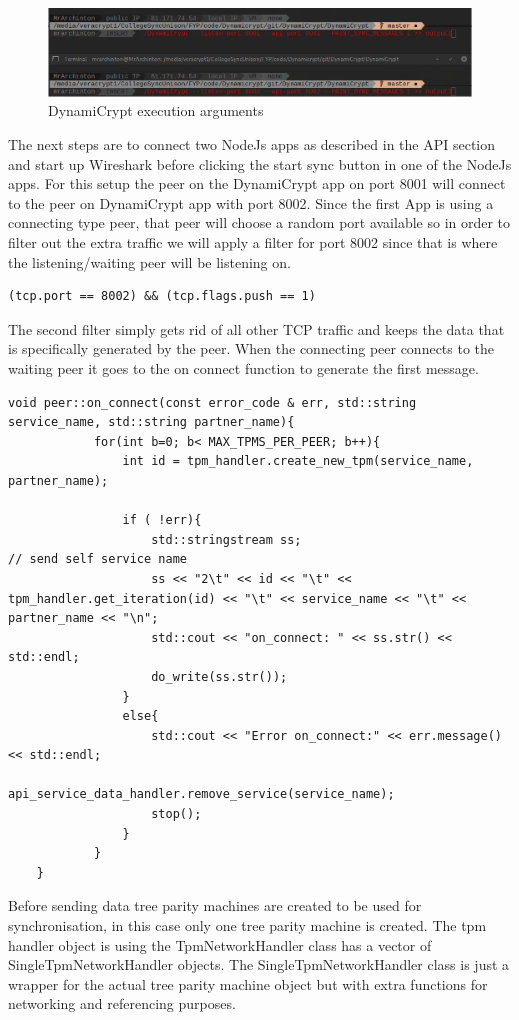 \begin{figure}[!h]
	\centering
	\includegraphics[width=1\textwidth]{Figures/sync1.png}
	\caption[DynamiCrypt execution arguments]{DynamiCrypt execution arguments}
	\label{fig:sync1}
\end{figure}
\FloatBarrier

The next steps are to connect two NodeJs apps as described in the API section and start up Wireshark before clicking the start sync button in one of the NodeJs apps.
For this setup the peer on the DynamiCrypt app on port 8001 will connect to the peer on DynamiCrypt app with port 8002. Since the first App is using a connecting type peer, that peer will choose a random port available so in order to filter out the extra traffic we will apply a filter for port 8002 since that is where the listening/waiting peer will be listening on. 
\begin{lstlisting}
(tcp.port == 8002) && (tcp.flags.push == 1)
\end{lstlisting}
The second filter simply gets rid of all other TCP traffic and keeps the data that is specifically generated by the peer.
When the connecting peer connects to the waiting peer it goes to the on connect function to generate the first message.
\begin{lstlisting}
void peer::on_connect(const error_code & err, std::string service_name, std::string partner_name){
			for(int b=0; b< MAX_TPMS_PER_PEER; b++){
				int id = tpm_handler.create_new_tpm(service_name, partner_name);
				
				if ( !err){      
					std::stringstream ss;                                               // send self service name
					ss << "2\t" << id << "\t" << tpm_handler.get_iteration(id) << "\t" << service_name << "\t" << partner_name << "\n";
					std::cout << "on_connect: " << ss.str() << std::endl;
					do_write(ss.str());
				}
				else{
					std::cout << "Error on_connect:" << err.message() << std::endl;
					api_service_data_handler.remove_service(service_name);
					stop();
				}
			}
	}
\end{lstlisting}
Before sending data tree parity machines are created to be used for synchronisation, in this case only one tree parity machine is created. The tpm handler object is using the TpmNetworkHandler class has a vector of SingleTpmNetworkHandler objects. The SingleTpmNetworkHandler class is just a wrapper for the actual tree parity machine object but with extra functions for networking and referencing purposes. 
